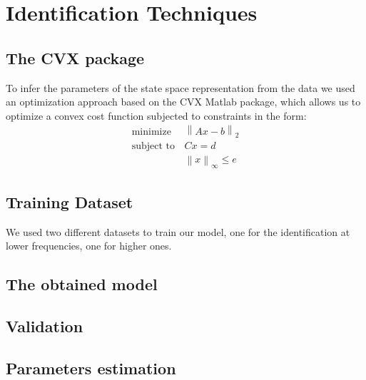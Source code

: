     \section{Identification Techniques}

        \subsection{The CVX package}

        To infer the parameters of the state space representation from the data we used an optimization approach based on the CVX Matlab package, which allows us to optimize a convex cost function subjected to constraints in the form:
            \begin{align*}
                \text{minimize}  & \left\|Ax-b\right\|_{2} \\
                \text{subject to} \, & Cx=d \\
                                    & \left\|x\right\|_{\infty} \leq e
            \end{align*}

        \subsection{Training Dataset}


        We used two different datasets to train our model, one for the identification at lower frequencies, one for higher ones.

        \subsection{The obtained model}


        \subsection{Validation}


        \subsection{Parameters estimation}

